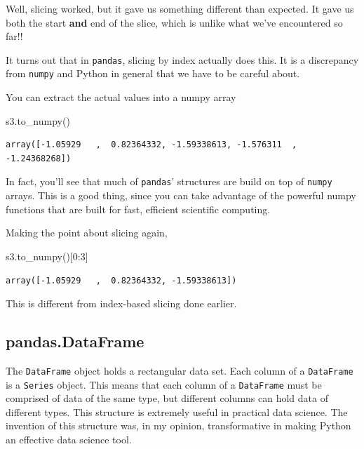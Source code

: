 \documentclass[
  letterpaper,
]{scrbook}
\newenvironment{Shaded}{\begin{snugshade}}{\end{snugshade}}
\newcommand{\DecValTok}[1]{\textcolor[rgb]{0.00,0.00,0.81}{#1}}
\newcommand{\NormalTok}[1]{#1}
\begin{document}
Well, slicing worked, but it gave us something different than expected. It gave us both the start \textbf{and} end of the slice, which is unlike what we've encountered so far!!

It turns out that in \texttt{pandas}, slicing by index actually does this. It is a discrepancy from \texttt{numpy} and Python in general that we have to be careful about.

You can extract the actual values into a numpy array

\begin{Shaded}
\begin{Highlighting}[]
\NormalTok{s3.to_numpy()}
\end{Highlighting}
\end{Shaded}

\begin{verbatim}
array([-1.05929   ,  0.82364332, -1.59338613, -1.576311  , -1.24368268])
\end{verbatim}

In fact, you'll see that much of \texttt{pandas}' structures are build on top of \texttt{numpy} arrays. This is a good thing, since you can take advantage of the powerful numpy functions that are built for fast, efficient scientific computing.

Making the point about slicing again,

\begin{Shaded}
\begin{Highlighting}[]
\NormalTok{s3.to_numpy()[}\DecValTok{0}\NormalTok{:}\DecValTok{3}\NormalTok{]}
\end{Highlighting}
\end{Shaded}

\begin{verbatim}
array([-1.05929   ,  0.82364332, -1.59338613])
\end{verbatim}

This is different from index-based slicing done earlier.

\hypertarget{pandas.dataframe}{%
\subsection{pandas.DataFrame}\label{pandas.dataframe}}

The \texttt{DataFrame} object holds a rectangular data set. Each column of a \texttt{DataFrame} is a \texttt{Series} object. This means that each column of a \texttt{DataFrame} must be comprised of data of the same type, but different columns can hold data of different types. This structure is extremely useful in practical data science. The invention of this structure was, in my opinion, transformative in making Python an effective data science tool.
\end{document}
